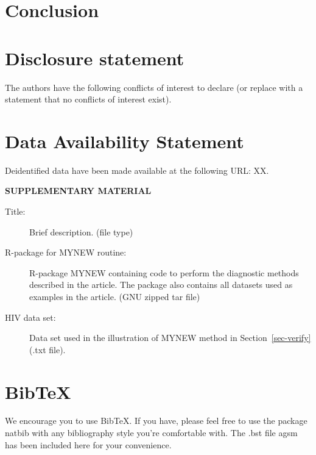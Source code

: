 \documentclass[
  12pt]{article}
\begin{document}
\addtolength{\textheight}{-.2in}%

\hypertarget{sec-conc}{%
\section{Conclusion}\label{sec-conc}}

\hypertarget{disclosure-statement}{%
\section{Disclosure statement}\label{disclosure-statement}}

The authors have the following conflicts of interest to declare (or
replace with a statement that no conflicts of interest exist).

\hypertarget{data-availability-statement}{%
\section{Data Availability
Statement}\label{data-availability-statement}}

Deidentified data have been made available at the following URL: XX.

\hypertarget{supplementary-material}{}
\bigskip

\begin{center}

{\large\bf SUPPLEMENTARY MATERIAL}

\end{center}

\begin{description}
\item[Title:]
Brief description. (file type)
\item[R-package for MYNEW routine:]
R-package MYNEW containing code to perform the diagnostic methods
described in the article. The package also contains all datasets used as
examples in the article. (GNU zipped tar file)
\item[HIV data set:]
Data set used in the illustration of MYNEW method in
Section~\ref{sec-verify} (.txt file).
\end{description}

\hypertarget{bibtex}{%
\section{BibTeX}\label{bibtex}}

We encourage you to use BibTeX. If you have, please feel free to use the
package natbib with any bibliography style you're comfortable with. The
.bst file agsm has been included here for your convenience.


  
\end{document}
